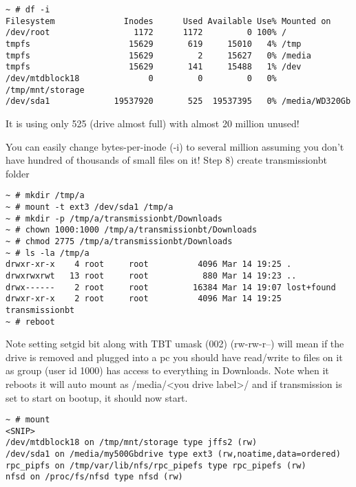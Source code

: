 \begin{itemize}
\begin{verbatim}
~ # df -i
Filesystem              Inodes      Used Available Use% Mounted on
/dev/root                 1172      1172         0 100% /
tmpfs                    15629       619     15010   4% /tmp
tmpfs                    15629         2     15627   0% /media
tmpfs                    15629       141     15488   1% /dev
/dev/mtdblock18              0         0         0   0% /tmp/mnt/storage
/dev/sda1             19537920       525  19537395   0% /media/WD320Gb
\end{verbatim}

It is using only 525 (drive almost full) with almost 20 million unused!

You can easily change bytes-per-inode (-i) to several million assuming you don't have hundred of thousands of small files on it!
Step 8) create transmissionbt folder

\begin{verbatim}
~ # mkdir /tmp/a
~ # mount -t ext3 /dev/sda1 /tmp/a
~ # mkdir -p /tmp/a/transmissionbt/Downloads
~ # chown 1000:1000 /tmp/a/transmissionbt/Downloads
~ # chmod 2775 /tmp/a/transmissionbt/Downloads
~ # ls -la /tmp/a
drwxr-xr-x    4 root     root          4096 Mar 14 19:25 .
drwxrwxrwt   13 root     root           880 Mar 14 19:23 ..
drwx------    2 root     root         16384 Mar 14 19:07 lost+found
drwxr-xr-x    2 root     root          4096 Mar 14 19:25 transmissionbt
~ # reboot
\end{verbatim}

    Note setting setgid bit along with TBT umask (002) (rw-rw-r--) will mean if the drive is removed and plugged into a pc you should have read/write to files on it as group (user id 1000) has access to everything in Downloads.
    Note when it reboots it will auto mount as /media/<you drive label>/ and if transmission is set to start on bootup, it should now start.

\begin{verbatim}
~ # mount
<SNIP>
/dev/mtdblock18 on /tmp/mnt/storage type jffs2 (rw)
/dev/sda1 on /media/my500Gbdrive type ext3 (rw,noatime,data=ordered)
rpc_pipfs on /tmp/var/lib/nfs/rpc_pipefs type rpc_pipefs (rw)
nfsd on /proc/fs/nfsd type nfsd (rw)
\end{verbatim}

\end{itemize}